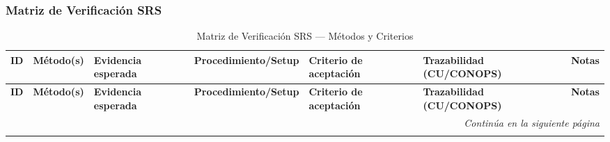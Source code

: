 \begin{landscape}
\begin{longtable}{|p{1.8cm}|p{1.4cm}|p{4.2cm}|p{4.8cm}|p{4.2cm}|p{3.2cm}|p{2.2cm}|}
\end{longtable}

\newpage

\subsubsection{Matriz de Verificación SRS}
\begin{longtable}{|p{1.8cm}|p{1.4cm}|p{4.2cm}|p{4.8cm}|p{4.2cm}|p{3.2cm}|p{2.2cm}|}
\caption{Matriz de Verificación SRS — Métodos y Criterios}\label{tab:v_matrix_srs}\\
\hline
\rowcolor{AgencyBlue!15}
\textbf{ID} & \textbf{Método(s)} & \textbf{Evidencia esperada} & \textbf{Procedimiento/Setup} & \textbf{Criterio de aceptación} & \textbf{Trazabilidad (CU/CONOPS)} & \textbf{Notas}\\
\hline
\endfirsthead

\hline
\rowcolor{AgencyBlue!15}
\textbf{ID} & \textbf{Método(s)} & \textbf{Evidencia esperada} & \textbf{Procedimiento/Setup} & \textbf{Criterio de aceptación} & \textbf{Trazabilidad (CU/CONOPS)} & \textbf{Notas}\\
\hline
\endhead

\hline
\multicolumn{7}{r}{\textit{Continúa en la siguiente página}}\\
\endfoot

\hline
\rowcolor{AgencyBlue!15}
\endlastfoot


\end{longtable}
\end{landscape}
